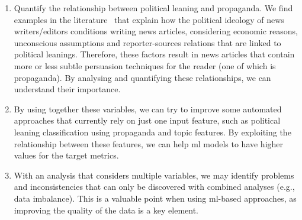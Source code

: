    \begin{enumerate}
        \item Quantify the relationship between political leaning and propaganda. 
        We find examples in the literature~\citep{schudson2002news} that explain how the political ideology of news writers/editors conditions writing news articles, considering economic reasons, unconscious assumptions and reporter-sources relations that are linked to political leanings. Therefore, these factors result in news articles that contain more or less subtle persuasion techniques for the reader (one of which is propaganda). By analysing and quantifying these relationships, we can understand their importance.
        \item By using together these variables, we can try to improve some automated approaches that currently rely on just one input feature, such as political leaning classification
        using propaganda and topic features. By exploiting the relationship between these features, we can help \acrfull{ml} models to have higher values for the target metrics. %
        \item With an analysis that considers multiple variables, we may identify problems and inconsistencies that can only be discovered with combined analyses (e.g., data imbalance). This is a valuable point when using \acrshort{ml}-based approaches, as improving the quality of the data is a key element. %
    \end{enumerate}
